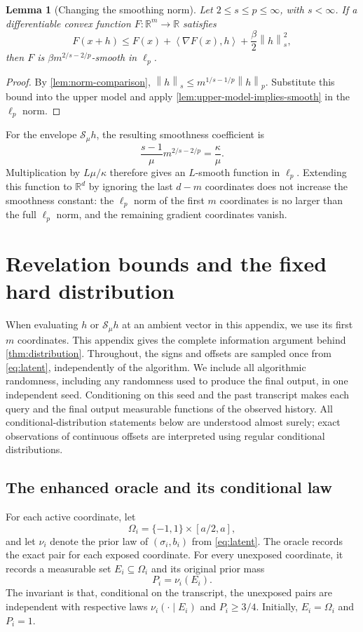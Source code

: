 \documentclass[11pt]{article}
\newcommand{\R}{\mathbb{R}}
\newcommand{\cS}{\mathcal{S}}
\newcommand{\ip}[2]{\left\langle #1,#2\right\rangle}
\newcommand{\norm}[2]{\left\lVert #1\right\rVert_{#2}}
\newtheorem{lemma}[lemma]{Lemma}
\theoremstyle{definition}
\theoremstyle{remark}
\begin{document}
\begin{lemma}[Changing the smoothing norm]
\label{lem:norm-conversion}
Let $2\le s\le p\le\infty$, with $s<\infty$.
If a differentiable convex function $F:\R^m\to\R$ satisfies
\[
 F(x+h)\le F(x)+\ip{\nabla F(x)}{h}
                   +\frac\beta2\norm{h}{s}^2,
\]
then $F$ is $\beta m^{2/s-2/p}$-smooth in $\ell_p$.
\end{lemma}

\begin{proof}
By \cref{lem:norm-comparison},
$\norm{h}{s}\le m^{1/s-1/p}\norm{h}{p}$.
Substitute this bound into the upper model and apply
\cref{lem:upper-model-implies-smooth} in the $\ell_p$ norm.
\end{proof}

For the envelope $\cS_\mu h$, the resulting smoothness coefficient is
\[
 \frac{s-1}{\mu}m^{2/s-2/p}=\frac\kappa\mu.
\]
Multiplication by $L\mu/\kappa$ therefore gives an $L$-smooth function
in $\ell_p$.  Extending this function to $\R^d$ by ignoring the last
$d-m$ coordinates does not increase the smoothness constant: the
$\ell_p$ norm of the first $m$ coordinates is no larger than the full
$\ell_p$ norm, and the remaining gradient coordinates vanish.

\section{Revelation bounds and the fixed hard distribution}
\label{app:revelation}

When evaluating $h$ or $\cS_\mu h$ at an ambient vector in this appendix,
we use its first $m$ coordinates. This appendix gives the complete information argument behind
\cref{thm:distribution}.  Throughout, the signs and offsets are sampled
once from \cref{eq:latent}, independently of the algorithm.  We include
all algorithmic randomness, including any randomness used to produce the
final output, in one independent seed.  Conditioning on this seed and
the past transcript makes each query and the final output measurable
functions of the observed history.  All conditional-distribution
statements below are understood almost surely; exact observations of
continuous offsets are interpreted using regular conditional
distributions.

\subsection{The enhanced oracle and its conditional law}

For each active coordinate, let
\[
 \Omega_i=\{-1,1\}\times[a/2,a],
\]
and let $\nu_i$ denote the prior law of $(\sigma_i,b_i)$ from
\cref{eq:latent}.  The oracle records the exact pair for each exposed
coordinate.  For every unexposed coordinate, it records a measurable
set $E_i\subseteq\Omega_i$ and its original prior mass
\[
 P_i=\nu_i(E_i).
\]
The invariant is that, conditional on the transcript, the unexposed
pairs are independent with respective laws $\nu_i(\cdot\mid E_i)$ and
$P_i\ge3/4$.  Initially, $E_i=\Omega_i$ and $P_i=1$.
\end{document}
